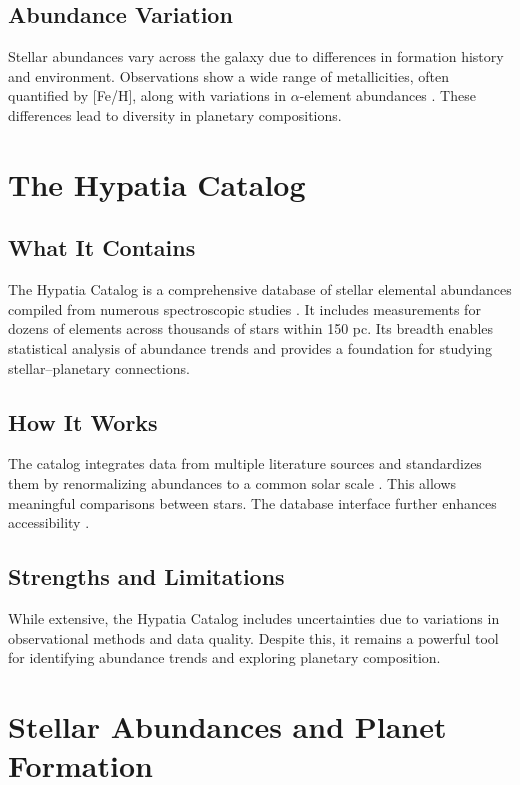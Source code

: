 \documentclass[12pt]{article}
\begin{document}
\subsection{Abundance Variation}

Stellar abundances vary across the galaxy due to differences in formation history and environment. Observations show a wide range of metallicities, often quantified by [Fe/H], along with variations in $\alpha$-element abundances \citep{Hinkel2014}. These differences lead to diversity in planetary compositions.

\section{The Hypatia Catalog}

\subsection{What It Contains}

The Hypatia Catalog is a comprehensive database of stellar elemental abundances compiled from numerous spectroscopic studies \citep{Hinkel2014}. It includes measurements for dozens of elements across thousands of stars within 150 pc. Its breadth enables statistical analysis of abundance trends and provides a foundation for studying stellar–planetary connections.

\subsection{How It Works}

The catalog integrates data from multiple literature sources and standardizes them by renormalizing abundances to a common solar scale \citep{Hinkel2014}. This allows meaningful comparisons between stars. The database interface further enhances accessibility \citep{Hinkel2017}.

\subsection{Strengths and Limitations}

While extensive, the Hypatia Catalog includes uncertainties due to variations in observational methods and data quality. Despite this, it remains a powerful tool for identifying abundance trends and exploring planetary composition.

\section{Stellar Abundances and Planet Formation}
\end{document}
